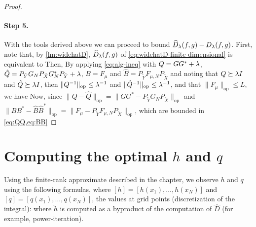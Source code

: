 \begin{proof}
\paragraph{Step 5.}
With the tools derived above we can proceed to bound $\widehat{D}_\lambda(f,g) - D_\lambda(f,g)$.
First, note that, by \cref{lm:widehatD}, $\widehat{D}_\lambda(f,g)$ of \cref{eq:widehatD-finite-dimensional} is equivalent to
Then,
By applying \cref{eq:alg-ineq} with $Q = GG^* + \lambda$, $\hat{Q} = P_{\tilde{Y}} G_N P_{\tilde{X}} G_N^*P_{\tilde{Y}} + \lambda$, $B = F_{\mu}$ and $\hat{B} = P_{\tilde{Y}} F_{\mu, N} P_{\tilde{X}}$ and noting that $Q \succeq \lambda I$ and $\hat{Q} \succeq \lambda I$, then $\|Q^{-1}\|_{\mathrm{op}} \leq \lambda^{-1}$ and $\|\hat{Q}^{-1}\|_{\mathrm{op}} \leq \lambda^{-1}$,
and that $\|F_{\mu}\|_{\mathrm{op}} \leq L$, we have
Now, since $\|Q - \hat{Q}\|_{\mathrm{op}} = \|GG^* - P_{\tilde{Y}}G_{N} P_{\tilde{X}}\|_{\mathrm{op}}$ and  $\|BB^* - \hat{B}\hat{B}^*\|_{\mathrm{op}} = \|F_\mu - P_{\tilde{Y}}F_{\mu,N} P_{\tilde{X}}\|_{\mathrm{op}}$, which are bounded in \cref{eq:QQ,eq:BB}
\end{proof}


\section{Computing the optimal $h$ and $q$}\label{sec:appendix-hq}

Using the finite-rank approximate described in the chapter, we observe $h$ and $q$ using the following formulas, where $[h] = [h(x_1), \ldots, h(x_N)]$ and $[q] = [q(x_1), \ldots, q(x_N)]$, the values at grid points (discretization of the integral):
where $\widetilde h$ is computed as a byproduct of the computation of $\widehat D$ (for example, power-iteration).
